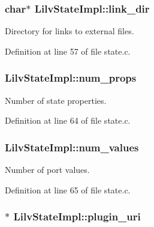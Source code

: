 \subsubsection[{\texorpdfstring{link\+\_\+dir}{link_dir}}]{\setlength{\rightskip}{0pt plus 5cm}char$\ast$ Lilv\+State\+Impl\+::link\+\_\+dir}\hypertarget{struct_lilv_state_impl_a7ddc78d3d2e8ab2cd72f339c65e219dc}{}\label{struct_lilv_state_impl_a7ddc78d3d2e8ab2cd72f339c65e219dc}


Directory for links to external files. 



Definition at line 57 of file state.\+c.

\subsubsection[{\texorpdfstring{num\+\_\+props}{num_props}}]{ Lilv\+State\+Impl\+::num\+\_\+props}\hypertarget{struct_lilv_state_impl_abbd24ab8ac4ef3cd927b0318048ecd93}{}\label{struct_lilv_state_impl_abbd24ab8ac4ef3cd927b0318048ecd93}


Number of state properties. 



Definition at line 64 of file state.\+c.

\subsubsection[{\texorpdfstring{num\+\_\+values}{num_values}}]{ Lilv\+State\+Impl\+::num\+\_\+values}\hypertarget{struct_lilv_state_impl_a1b72121ebc7e73928d9be8e210bc7c87}{}\label{struct_lilv_state_impl_a1b72121ebc7e73928d9be8e210bc7c87}


Number of port values. 



Definition at line 65 of file state.\+c.

\subsubsection[{\texorpdfstring{plugin\+\_\+uri}{plugin_uri}}]{$\ast$ Lilv\+State\+Impl\+::plugin\+\_\+uri}\hypertarget{struct_lilv_state_impl_a97a4d9bd654fd4933145fce964838687}{}\label{struct_lilv_state_impl_a97a4d9bd654fd4933145fce964838687}


